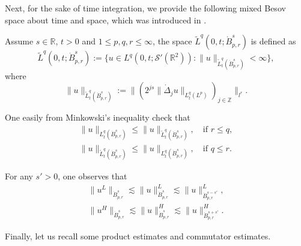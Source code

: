 \documentclass[reqno]{amsart}
\begin{document}
Next, for the sake of time integration, we provide the following mixed Besov space
about time and space, which was introduced in \cite{MR1354312}.

\begin{definition}\label{def2.2} \rm
Assume $s\in\mathbb{R}$, $t>0$ and $1\leqslant p,q,r\leqslant\infty$, the space
$\tilde{L}^q(0,t;\dot{B}^s_{p,r})$ is defined as
\[
 \tilde{L}^q(0,t;\dot{B}^s_{p,r}):=\{u\in L^q(0,t;\mathcal{S}'(\mathbb{R}^2)):\|u\|_{\tilde{L}^q_t(\dot{B}^s_{p,r})}<\infty\},
\]
 where
\[
 \|u\|_{\tilde{L}^q_t(\dot{B}^s_{p,r})}:=\|(2^{js}\|\dot{\Delta}_ju\|_{L^q_t(L^p)})_{j\in\mathbb{Z}}\|_{l^r}.
\]
\end{definition}

\begin{remark}\label{rem2.1} \rm
One easily from Minkowski's inequality check that
 \begin{equation} \label{2.5}
 \begin{gathered}
 \|u\|_{{L}^q_t(\dot{B}^s_{p,r})}\leqslant\|u\|_{\tilde{L}^q_t(\dot{B}^s_{p,r})},
 \quad\text{if }r\leqslant q,\\
 \|u\|_{\tilde{L}^q_t(\dot{B}^s_{p,r})}\leqslant\|u\|_{{L}^q_t(\dot{B}^s_{p,r})},
 \quad\text{if }q\leqslant r.
 \end{gathered}
 \end{equation}
\end{remark}

For any $s'>0$, one observes that
\begin{equation} \label{2.6}
 \begin{gathered}
 \|u^L\|_{\dot{B}^s_{p,r}}\lesssim\|u\|^L_{\dot{B}^s_{p,r}}\lesssim\|u\|^L_{\dot{B}^{s-s'}_{p,r}},\\
 \|u^H\|_{\dot{B}^s_{p,r}}\lesssim\|u\|^H_{\dot{B}^s_{p,r}}\lesssim\|u\|^H_{\dot{B}^{s+s'}_{p,r}}.
 \end{gathered}
\end{equation}

Finally, let us recall some product estimates and commutator estimates.
\end{document}

